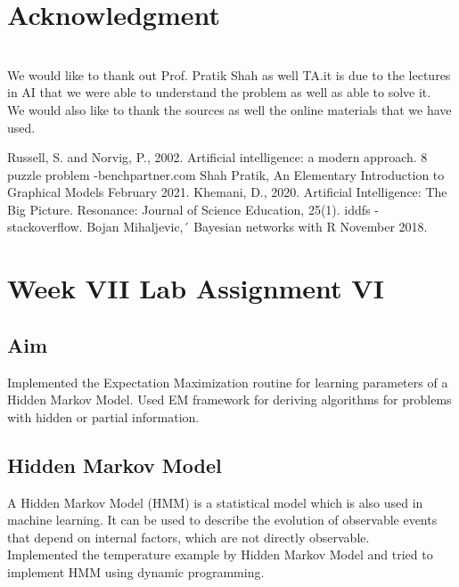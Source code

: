 \documentclass[conference]{IEEEtran}
\begin{document}
\section*{Acknowledgment}
\\
We would like to thank out Prof. Pratik Shah as well TA.it is due to the lectures in AI that we were able to understand the problem as well as able to solve it.
\\
We would also like to thank the sources as well the online materials that we have used.

\begin{thebibliography}{00}
 Russell, S. and Norvig, P., 2002. Artificial intelligence: a modern approach.
8 puzzle problem -benchpartner.com
Shah Pratik, An Elementary Introduction to Graphical Models February
2021.
 Khemani, D., 2020. Artificial Intelligence: The Big Picture. Resonance: Journal of Science Education, 25(1).
iddfs - stackoverflow.
Bojan Mihaljevic,´ Bayesian networks with R November 2018.
\end{thebibliography}
\vspace{12pt}


\section{Week VII Lab Assignment VI}

\subsection{Aim}
Implemented the Expectation Maximization routine for learning parameters of a Hidden Markov Model. Used EM framework for deriving algorithms for problems with hidden or partial information.

\subsection{Hidden Markov Model}
A Hidden Markov Model (HMM) is a statistical model which is also used in machine learning. It can be used to describe the evolution of observable events that depend on internal factors, which are not directly observable.
\\
Implemented the temperature example by Hidden Markov Model and tried to implement HMM using dynamic programming.\\

\end{document}
